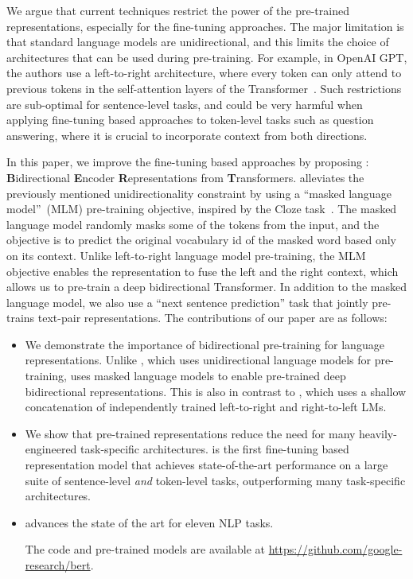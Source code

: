We argue that current techniques restrict the power of the pre-trained representations, especially for the fine-tuning approaches. The major limitation is that standard language models are unidirectional, and this limits the choice of architectures that can be used during pre-training. For example, in OpenAI GPT, the authors use a left-to-right architecture, where every token can only attend to previous tokens in the self-attention layers of the Transformer~\cite{vaswani-etal:2017:_atten}. Such restrictions are sub-optimal for sentence-level tasks, and could be very harmful when applying fine-tuning based approaches to token-level tasks such as  question answering, where it is crucial to incorporate context from both directions.

In this paper, we improve the fine-tuning based approaches by proposing \bert: \textbf{B}idirectional \textbf{E}ncoder \textbf{R}epresentations from \textbf{T}ransformers. \bert alleviates the previously mentioned unidirectionality constraint by using a ``masked language model''~(MLM) pre-training objective, inspired by the Cloze task~\cite{taylor:1953:_cloze}. The masked language model randomly masks some of the tokens from the input, and the objective is to predict the original vocabulary id of the masked word based only on its context. Unlike left-to-right language model pre-training, the MLM objective enables the representation to fuse the left and the right context, which allows us to pre-train a deep bidirectional Transformer. In addition to the masked language model, we also use a ``next sentence prediction'' task that jointly pre-trains text-pair representations. The contributions of our paper are as follows:

\begin{itemize}[leftmargin=1em]
  \item We demonstrate the importance of bidirectional pre-training for language representations. Unlike \citet{radford-etal:2018}, which uses unidirectional language models for pre-training, \bert uses masked language models to enable pre-trained deep bidirectional representations. This is also in contrast to \citet{peters-etal:2018:_deep}, which uses a shallow concatenation of independently trained left-to-right and right-to-left LMs.
  \item We show that pre-trained representations reduce the need for many heavily-engineered task-specific architectures. \bert is the first fine-tuning based representation model that achieves state-of-the-art performance on a large suite of sentence-level {\em and} token-level tasks, outperforming many task-specific architectures.
  \item \bert advances the state of the art for eleven NLP tasks. 

    The code and pre-trained models are available at \url{https://github.com/google-research/bert}.
\end{itemize}

